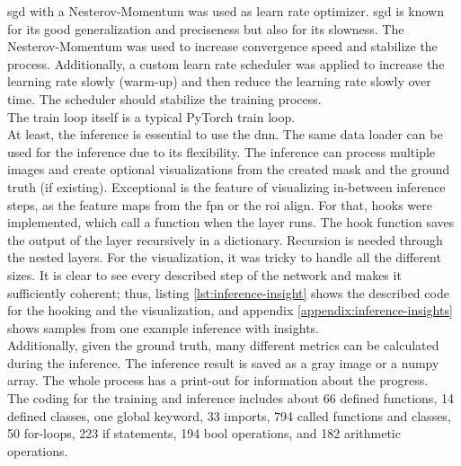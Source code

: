 		\ac{sgd} with a Nesterov-Momentum \cite{Botev2016} was used as learn rate optimizer. \ac{sgd} is known for its good generalization and preciseness but also for its slowness. The Nesterov-Momentum was used to increase convergence speed and stabilize the process. Additionally, a custom learn rate scheduler was applied to increase the learning rate slowly (warm-up) and then reduce the learning rate slowly over time. The scheduler should stabilize the training process.\\ The train loop itself is a typical PyTorch train loop. \\
		At least, the inference is essential to use the \ac{dnn}. The same data loader can be used for the inference due to its flexibility. The inference can process multiple images and create optional visualizations from the created mask and the ground truth (if existing). Exceptional is the feature of visualizing in-between inference steps, as the feature maps from the \ac{fpn} or the \ac{roi} align. For that, hooks were implemented, which call a function when the layer runs. The hook function saves the output of the layer recursively in a dictionary. Recursion is needed through the nested layers. For the visualization, it was tricky to handle all the different sizes. It is clear to see every described step of the network and makes it sufficiently coherent; thus, listing \ref{lst:inference-insight} shows the described code for the hooking and the visualization, and appendix \ref{appendix:inference-insights} shows samples from one example inference with insights.\\
		Additionally, given the ground truth, many different metrics can be calculated during the inference. The inference result is saved as a gray image or a numpy array. The whole process has a print-out for information about the progress.\\
		The coding for the training and inference includes about 66 defined functions, 14 defined classes, one global keyword, 33 imports, 794 called functions and classes, 50 for-loops, 223 if statements, 194 bool operations, and 182 arithmetic operations.
	
	
	
	

